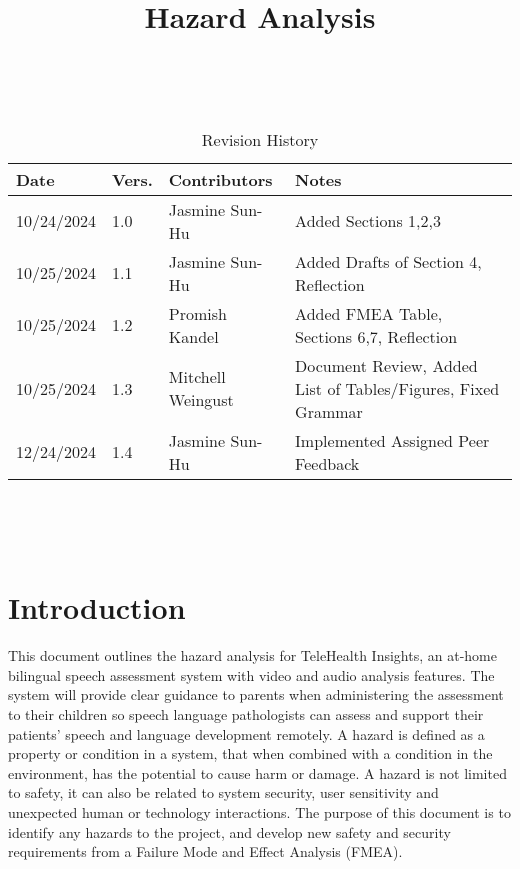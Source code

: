 \documentclass{article}
\title{Hazard Analysis\\\progname}
\author{\authname}
\date{}
\begin{document}
\maketitle
\thispagestyle{empty}

~\newpage


\begin{table}[hp]
\caption{Revision History} \label{TblRevisionHistory}
\begin{tabularx}{\textwidth}{p{1.5cm}p{1cm}p{3.5cm}X}
\toprule {\textbf{Date}} & {\textbf{Vers.}} & {\textbf{Contributors}} & {\textbf{Notes}}\\
\midrule
10/24/2024 & 1.0 & Jasmine Sun-Hu & Added Sections 1,2,3\\
10/25/2024 & 1.1 & Jasmine Sun-Hu & Added Drafts of Section 4, Reflection\\
10/25/2024 & 1.2 & Promish Kandel & Added FMEA Table, Sections 6,7, Reflection\\
10/25/2024 & 1.3 & Mitchell Weingust & Document Review, Added List of Tables/Figures, Fixed Grammar\\
12/24/2024 & 1.4 & Jasmine Sun-Hu & Implemented Assigned Peer Feedback\\
\bottomrule
\end{tabularx}
\end{table}

~\newpage

\tableofcontents
\listoffigures
\listoftables

~\newpage


\section{Introduction}

\hspace{1.5em} This document outlines the hazard analysis for TeleHealth Insights, an at-home bilingual speech 
assessment system with video and audio analysis features. The system will provide clear guidance to
parents when administering the assessment to their children so speech language pathologists can assess and support
their patients' speech and language development remotely. A hazard is defined as a 
property or condition in a system, that when combined with a condition in the environment, has the potential to cause harm or 
damage. A hazard is not limited to safety, it can also be related to system security, user sensitivity and 
unexpected human or technology interactions. The purpose of this document is to identify any hazards to the project, and 
develop new safety and security requirements from a Failure Mode and Effect Analysis (FMEA).
\end{document}
